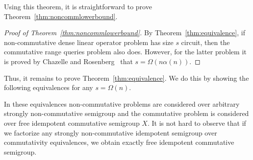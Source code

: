 \documentclass[11pt,letterpaper]{article}
\begin{document}
Using this theorem, it is straightforward to prove
Theorem~\ref{thm:noncommlowerbound}.

\begin{proof}[Proof of Theorem~\ref{thm:noncommlowerbound}]
By Theorem~\ref{thm:equivalence}, if non-commutative dense linear operator problem has size $s$ circuit, then the commutative range queries problem also does. However, for the latter problem it is proved by Chazelle and Rosenberg~\cite{DBLP:journals/ijcga/ChazelleR91} that $s=\Omega(n \alpha(n))$.
\end{proof}

Thus, it remains to prove Theorem~\ref{thm:equivalence}. We do this by showing the following equivalences for any $s = \Omega(n)$.

\begin{center}
\end{center}

In these equivalences non-commutative problems are considered over arbitrary strongly non-commutative semigroup and the commutative problem is considered over free idempotent commutative semigroup $X$. It is not hard to observe that if we factorize any strongly non-commutative idempotent semigroup over commutativity equivalences, we obtain exactly free idempotent commutative semigroup.




%
%
\end{document}
